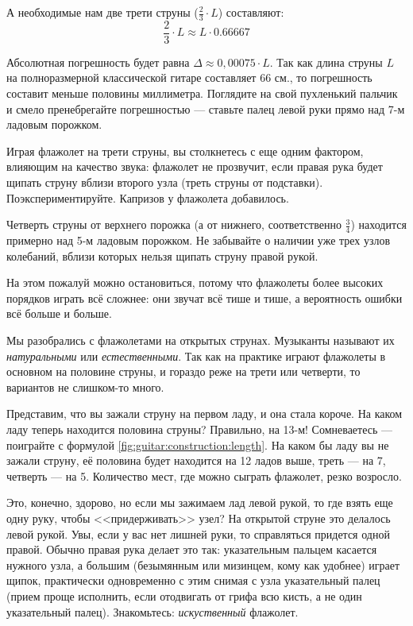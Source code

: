 А необходимые нам две трети струны ($\frac{2}{3}\cdot L$) составляют:
\[
    \frac{2}{3}\cdot L \approx L\cdot 0.66667
\]

Абсолютная погрешность будет равна $\Delta \approx 0,00075 \cdot L$. Так как длина струны $L$ на полноразмерной классической гитаре составляет $66$ см., то погрешность составит меньше половины миллиметра. Поглядите на свой пухленький пальчик и смело пренебрегайте погрешностью --- ставьте палец левой руки прямо над 7-м ладовым порожком.

Играя флажолет на трети струны, вы столкнетесь с еще одним фактором, влияющим на качество звука: флажолет не прозвучит, если правая рука будет щипать струну вблизи второго узла (треть струны от подставки). Поэкспериментируйте. Капризов у флажолета добавилось.

Четверть струны от верхнего порожка (а от нижнего, соответственно $\frac{3}{4}$) находится примерно над 5-м ладовым порожком. Не забывайте о наличии уже трех узлов колебаний, вблизи которых нельзя щипать струну правой рукой.

На этом пожалуй можно остановиться, потому что флажолеты более высоких порядков играть всё сложнее: они звучат всё тише и тише, а вероятность ошибки всё больше и больше.

Мы разобрались с флажолетами на открытых струнах. Музыканты называют их \emph{натуральными} или \emph{естественными}. Так как на практике играют флажолеты в основном на половине струны, и гораздо реже на трети или четверти, то вариантов не слишком-то много.

Представим, что вы зажали струну на первом ладу, и она стала короче. На каком ладу теперь находится половина струны? Правильно, на 13-м! Сомневаетесь --- поиграйте с формулой \ref{fig:guitar:construction:length}. На каком бы ладу вы не зажали струну, её половина будет находится на 12 ладов выше, треть --- на 7, четверть --- на 5. Количество мест, где можно сыграть флажолет, резко возросло.

Это, конечно, здорово, но если мы зажимаем лад левой рукой, то где взять еще одну руку, чтобы <<придерживать>> узел? На открытой струне это делалось левой рукой. Увы, если у вас нет лишней руки, то справляться придется одной правой. Обычно правая рука делает это так: указательным пальцем касается нужного узла, а большим (безымянным или мизинцем, кому как удобнее) играет щипок, практически одновременно с этим снимая с узла указательный палец (прием проще исполнить, если отодвигать от грифа всю кисть, а не один указательный палец). Знакомьтесь: \emph{искуственный} флажолет.

